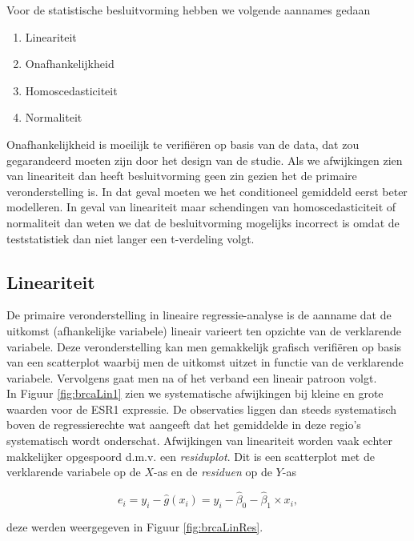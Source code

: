 \documentclass[
  12pt,dutch,coursenotes]{book}
\providecommand{\tightlist}{%
  \setlength{\itemsep}{0pt}\setlength{\parskip}{0pt}}
\begin{document}
Voor de statistische besluitvorming hebben we volgende aannames gedaan

\begin{enumerate}
\def\labelenumi{\arabic{enumi}.}
\tightlist
\item
  Lineariteit
\item
  Onafhankelijkheid\\
\item
  Homoscedasticiteit
\item
  Normaliteit
\end{enumerate}

Onafhankelijkheid is moeilijk te verifiëren op basis van de data, dat zou gegarandeerd moeten zijn door het design van de studie.
Als we afwijkingen zien van lineariteit dan heeft besluitvorming geen zin gezien het de primaire veronderstelling is.
In dat geval moeten we het conditioneel gemiddeld eerst beter modelleren.
In geval van lineariteit maar schendingen van homoscedasticiteit of normaliteit dan weten we dat de besluitvorming mogelijks incorrect is omdat de teststatistiek dan niet langer een t-verdeling volgt.

\hypertarget{lineariteit}{%
\subsection{Lineariteit}\label{lineariteit}}

De primaire veronderstelling in lineaire regressie-analyse is de aanname dat de uitkomst (afhankelijke variabele) lineair varieert ten opzichte van de verklarende variabele. Deze veronderstelling kan men gemakkelijk grafisch verifiëren op basis van een scatterplot waarbij men de uitkomst uitzet in functie van de verklarende variabele. Vervolgens gaat men na of het verband een lineair patroon volgt.\\
In Figuur \ref{fig:brcaLin1} zien we systematische afwijkingen bij kleine en grote waarden voor de ESR1 expressie.
De observaties liggen dan steeds systematisch boven de regressierechte wat aangeeft dat het gemiddelde in deze regio's systematisch wordt onderschat.
Afwijkingen van lineariteit worden vaak echter makkelijker opgespoord d.m.v. een \emph{residuplot}. Dit is een scatterplot met de
verklarende variabele op de \(X\)-as en de \emph{residuen} op de \(Y\)-as

\[e_i=y_i-\hat{g}(x_i)=y_i-\hat\beta_0-\hat\beta_1\times x_i,\]

deze werden weergegeven in Figuur \ref{fig:brcaLinRes}.
\end{document}

